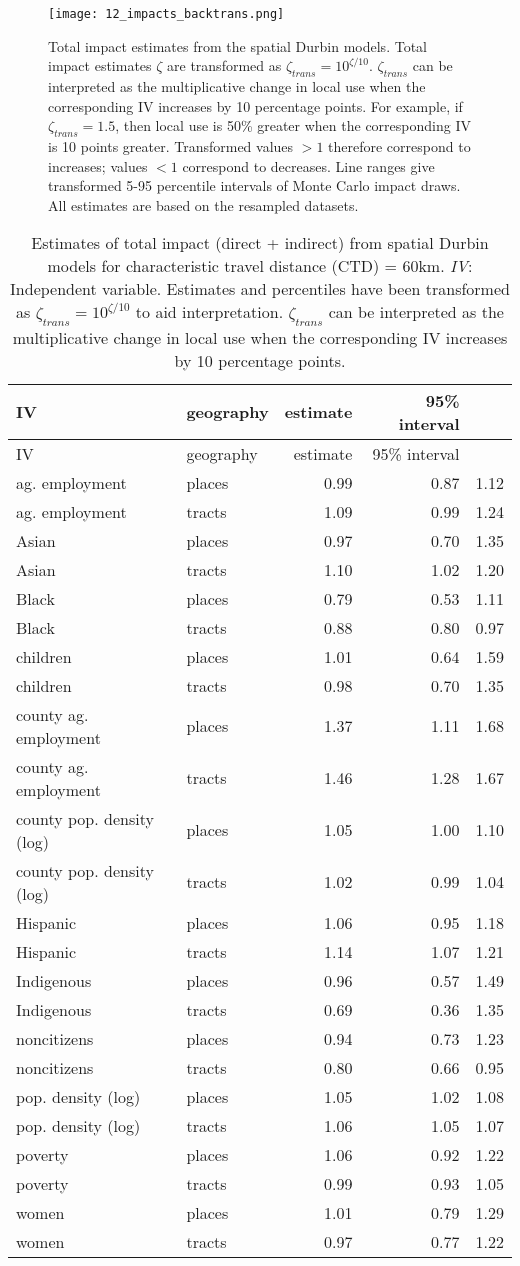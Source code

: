 \documentclass[ijerph,article,submit,oneauthor,pdftex]{Definitions/mdpi}
\begin{document}
\begin{figure}
\centering
\texttt{[image: 12\_impacts\_backtrans.png]}
\caption{Total impact estimates from the spatial Durbin models. Total impact estimates \(\zeta\) are transformed as \(\zeta_{trans} = 10^{\zeta/10}\). \(\zeta_{trans}\) can be interpreted as the multiplicative change in local use when the corresponding IV increases by 10 percentage points. For example, if \(\zeta_{trans} = 1.5\), then local use is 50\% greater when the corresponding IV is 10 points greater. Transformed values \(>1\) therefore correspond to increases; values \(<1\) correspond to decreases. Line ranges give transformed 5-95 percentile intervals of Monte Carlo impact draws. All estimates are based on the resampled datasets. \label{fig.impacts_backtrans}}
\end{figure}

\begin{longtable}[]{@{}llrrr@{}}
\caption{Estimates of total impact (direct + indirect) from spatial Durbin models for characteristic travel distance (CTD) = 60km. \emph{IV}: Independent variable. Estimates and percentiles have been transformed as \(\zeta_{trans} = 10^{\zeta/10}\) to aid interpretation. \(\zeta_{trans}\) can be interpreted as the multiplicative change in local use when the corresponding IV increases by 10 percentage points. \label{tab.impacts}}\tabularnewline
\toprule
IV & geography & estimate & 95\% interval &\tabularnewline
\midrule
\endfirsthead
\toprule
IV & geography & estimate & 95\% interval &\tabularnewline
\midrule
\endhead
ag. employment & places & 0.99 & 0.87 & 1.12\tabularnewline
ag. employment & tracts & 1.09 & 0.99 & 1.24\tabularnewline
Asian & places & 0.97 & 0.70 & 1.35\tabularnewline
Asian & tracts & 1.10 & 1.02 & 1.20\tabularnewline
Black & places & 0.79 & 0.53 & 1.11\tabularnewline
Black & tracts & 0.88 & 0.80 & 0.97\tabularnewline
children & places & 1.01 & 0.64 & 1.59\tabularnewline
children & tracts & 0.98 & 0.70 & 1.35\tabularnewline
county ag. employment & places & 1.37 & 1.11 & 1.68\tabularnewline
county ag. employment & tracts & 1.46 & 1.28 & 1.67\tabularnewline
county pop. density (log) & places & 1.05 & 1.00 & 1.10\tabularnewline
county pop. density (log) & tracts & 1.02 & 0.99 & 1.04\tabularnewline
Hispanic & places & 1.06 & 0.95 & 1.18\tabularnewline
Hispanic & tracts & 1.14 & 1.07 & 1.21\tabularnewline
Indigenous & places & 0.96 & 0.57 & 1.49\tabularnewline
Indigenous & tracts & 0.69 & 0.36 & 1.35\tabularnewline
noncitizens & places & 0.94 & 0.73 & 1.23\tabularnewline
noncitizens & tracts & 0.80 & 0.66 & 0.95\tabularnewline
pop. density (log) & places & 1.05 & 1.02 & 1.08\tabularnewline
pop. density (log) & tracts & 1.06 & 1.05 & 1.07\tabularnewline
poverty & places & 1.06 & 0.92 & 1.22\tabularnewline
poverty & tracts & 0.99 & 0.93 & 1.05\tabularnewline
women & places & 1.01 & 0.79 & 1.29\tabularnewline
women & tracts & 0.97 & 0.77 & 1.22\tabularnewline
\bottomrule
\end{longtable}
\end{document}

